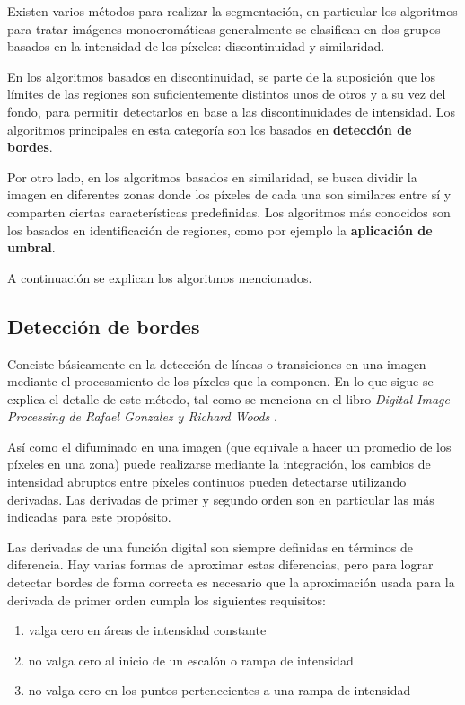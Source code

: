  Existen varios métodos para realizar la segmentación, en particular los algoritmos para tratar imágenes monocromáticas generalmente se clasifican en dos grupos basados en la intensidad de los píxeles: discontinuidad y similaridad. 

En los algoritmos basados en discontinuidad, se parte de la suposición que los límites de las regiones son suficientemente distintos unos de otros y a su vez del fondo, para permitir detectarlos en base a las discontinuidades de intensidad. Los algoritmos principales en esta categoría son los basados en \textbf{detección de bordes}.

Por otro lado, en los algoritmos basados en similaridad, se busca dividir la imagen en diferentes zonas donde los píxeles de cada una son similares entre sí y comparten ciertas características predefinidas. Los algoritmos más conocidos son los basados en identificación de regiones, como por ejemplo la \textbf{aplicación de umbral}.

A continuación se explican los algoritmos mencionados.

\subsection{Detección de bordes}
\label{detecbordeSec}

Conciste básicamente en la detección de líneas o transiciones en una imagen mediante el procesamiento de los píxeles que la componen. En lo que sigue se explica el detalle de este método, tal como se menciona en el libro \textit{Digital Image Processing de Rafael Gonzalez y Richard Woods} \cite{Gonzalez}.

Así como el difuminado en una imagen (que equivale a hacer un promedio de los píxeles en una zona) puede realizarse mediante la integración, los cambios de intensidad abruptos entre píxeles continuos pueden detectarse utilizando derivadas. Las derivadas de primer y segundo orden son en particular las más indicadas para este propósito.

Las derivadas de una función digital son siempre definidas en términos de diferencia. Hay varias formas de aproximar estas diferencias, pero para lograr detectar bordes de forma correcta es necesario que la aproximación usada para la derivada de primer orden cumpla los siguientes requisitos:

\begin{enumerate}
\item valga cero en áreas de intensidad constante
\item no valga cero al inicio de un escalón o rampa de intensidad
\item no valga cero en los puntos pertenecientes a una rampa de intensidad
\end{enumerate}


